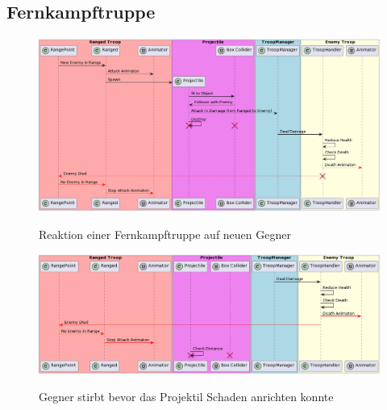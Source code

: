 \subsection{Fernkampftruppe}
\begin{figure}[H]
    \centering
    \includegraphics[width=15cm]{resources/RangedAttacks.png}\\
    \caption{Reaktion einer Fernkampftruppe auf neuen Gegner}
\end{figure}
\begin{figure}[H]
    \centering
    \includegraphics[width=15cm]{resources/Projectile.png}\\
    \caption{Gegner stirbt bevor das Projektil Schaden anrichten konnte}
\end{figure}


